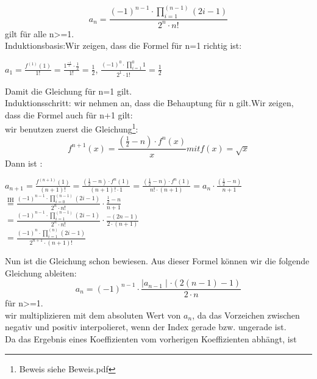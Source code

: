 \documentclass[course=erap]{aspdoc}
\begin{document}
\begin{equation} \label{eq4}
    a_n=\frac{(-1)^{n-1} \cdot \prod_{i=1}^{(n-1)} (2i-1)}{2^{n} \cdot n!}
\end{equation}
gilt für alle n>=1.
\\ Induktionsbasis:Wir zeigen, dass die Formel für n=1 richtig ist:
\begin{center}
    $ a_1=\frac{f^{(1)}(1)}{1!} =\frac{1^{\frac{-1}{2}}\cdot \frac{1}{2} }{1!} =\frac{1}{2} $,  $\frac{(-1)^{0} \cdot \prod_{i=1}^0 1}{2^{1} \cdot 1!} =\frac{1}{2}$
\end{center}
Damit die Gleichung für n=1 gilt.\\
Induktionsschritt: wir nehmen an, dass die Behauptung für n gilt.Wir zeigen, dass die Formel auch für n+1 gilt:
\\ wir benutzen zuerst die Gleichung\footnote{Beweis siehe Beweis.pdf}:
\begin{equation} \label{eq5}
    f^{n+1}(x)=\frac{(\frac{1}{2}-n)\cdot  f^{n}(x)}{x}   mit f(x) =\sqrt{x}
\end{equation}
Dann ist :
\begin{center}\label{eq6}


    $
        a_{n+1}=\frac{f^{(n+1)}(1)}{(n+1)!}
        =\frac{(\frac{1}{2}-n)\cdot  f^{n}(1)  }{(n+1)!\cdot 1}
        =\frac{(\frac{1}{2}-n)\cdot  f^{n}(1)  }{n!\cdot (n+1)}
        = a_n \cdot \frac{(\frac{1}{2}-n)} {n+1}
    $
    \\
    $
        \stackrel{\text{IH}}{=}\frac{(-1)^{n-1}
            \cdot \prod_{i=0}^{(n-1)} (2i-1)}{2^{n} \cdot n!} \cdot \frac{\frac{1}{2}-n} {n+1}$
    \\
    $=\frac{(-1)^{n-1} \cdot \prod_{i=1}^{(n-1)} (2i-1)}{2^{n} \cdot n!} \cdot \frac{-(2n-1)}{2 \cdot (n+1)}$
    \\
    $=\frac{(-1)^{n} \cdot \prod_{i=1}^{(n)} (2i-1)}{2^{n+1} \cdot (n+1)!}$
\end{center}
Nun ist die Gleichung schon bewiesen. Aus dieser Formel können wir die folgende Gleichung ableiten:
\begin{equation}\label{eq7}
    a_{n}=(-1)^{n-1}\cdot \frac{\mid a_{n-1}\mid \cdot (2(n-1)-1)} {2 \cdot n}
\end{equation}
für n>=1.
\\ wir multiplizieren mit dem absoluten Wert von $a_{n}$, da das Vorzeichen zwischen negativ und positiv interpolieret, wenn der Index gerade bzw. ungerade ist.
\\ Da das Ergebnis eines Koeffizienten  vom vorherigen Koeffizienten abhängt, ist
\end{document}
